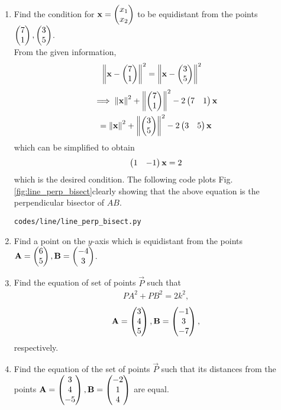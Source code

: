 \documentclass[journal,12pt,twocolumn]{IEEEtran}
\renewcommand\thesection{\arabic{section}}
\begin{document}
\begin{enumerate}[label=\thesection.\arabic*.,ref=\thesection.\theenumi]
\item Find the condition for $\mathbf{x} = \begin{pmatrix}x_1\\x_2\end{pmatrix}$ to be equidistant from the points $\begin{pmatrix}7\\1\end{pmatrix}, \begin{pmatrix}3\\5\end{pmatrix}$.
\label{prob:line_perp_bisect}
%
\\
\solution From the given information,
%
\begin{align}
\left\lVert\mathbf{x}-\begin{pmatrix}7\\1\end{pmatrix}\right\rVert^2&=\left\lVert\mathbf{x}-\begin{pmatrix}3\\5\end{pmatrix}\right\rVert^2
\end{align}
\begin{multline}
\implies \left\lVert\mathbf{x}\right\rVert^2 + \left\lVert\begin{pmatrix}7\\1\end{pmatrix}\right\rVert^2-2\begin{pmatrix}7&1\end{pmatrix}\mathbf{x} 
\\= 
 \left\lVert\mathbf{x}\right\rVert^2 + \left\lVert\begin{pmatrix}3\\5\end{pmatrix}\right\rVert^2-2\begin{pmatrix}3&5\end{pmatrix}\mathbf{x} 
\end{multline}
%
which can be simplified to obtain
\begin{align}
\label{eq:line_p_bisect}
\begin{pmatrix}1 & -1\end{pmatrix}\mathbf{x} = 2
\end{align}
%
which is the desired condition.  
The following code plots Fig. \ref{fig:line_perp_bisect}clearly showing that the above equation 
 is the perpendicular bisector of $AB$.

%
\begin{lstlisting}
codes/line/line_perp_bisect.py
\end{lstlisting}
%
\item Find a point on the $y$-axis which is equidistant from the points $\mathbf{A} = \begin{pmatrix}6\\5\end{pmatrix}, \mathbf{B} = \begin{pmatrix}-4\\3\end{pmatrix}$.
\\
\solution
%
\item Find the equation of set of points $\vec{P}$ such that
\begin{align}
PA^2+PB^2 =2k^2,
\end{align}
%
\begin{align}
\mathbf{A} = \begin{pmatrix}3\\4 \\5\end{pmatrix},
\mathbf{B} = \begin{pmatrix}-1\\3 \\-7\end{pmatrix},
\end{align}
%
respectively.
%
%
\solution
%   
\item Find the equation of the set of points $\vec{P}$ such that its distances from the points
$
\mathbf{A}=\begin{pmatrix}3\\4\\-5\end{pmatrix}, 
\mathbf{B}=\begin{pmatrix}-2\\1\\4\end{pmatrix}
$
are equal. 
\\
\solution
%
\end{enumerate}
\end{document}
